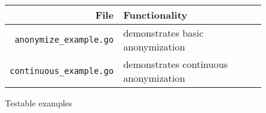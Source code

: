 \begin{figure}[H]
    \centering
    \small
    \begin{tabular}{r p{8cm}}
        \toprule
        \textbf{File} & \textbf{Functionality} \\
        \midrule
        \texttt{anonymize\_example.go}   & demonstrates basic anonymization \\
        \texttt{continuous\_example.go}  & demonstrates continuous anonymization \\
        \bottomrule
    \end{tabular}
    \caption{Testable examples}\label{fig:testable_examples}
\end{figure}
